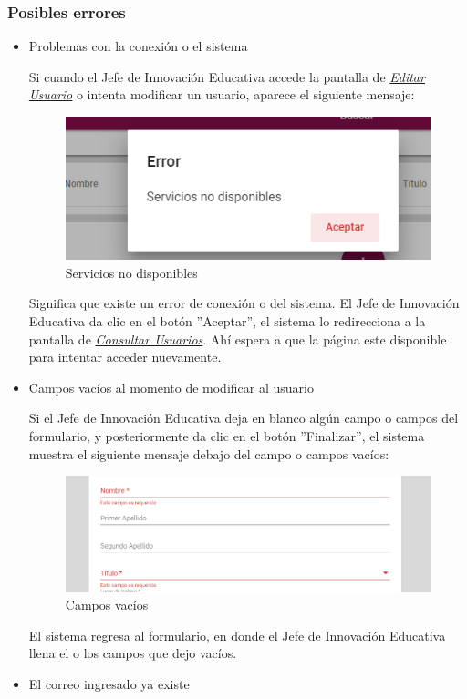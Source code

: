 \subsubsection{Posibles errores}
\begin{itemize}
	\item Problemas con la conexión o el sistema

	Si cuando el Jefe de Innovación Educativa accede la pantalla de \hyperlink{editarUs}{\textit{Editar Usuario}} o intenta modificar un usuario, aparece el siguiente mensaje:
	\clearpage
	\begin{figure}[H]
		\centering
		\includegraphics[width=0.4\linewidth]{images/SP5/MSGSN}
		\caption{Servicios no disponibles}

	\end{figure}


	Significa que existe un error de conexión o del sistema. El Jefe de Innovación Educativa da clic en el botón ''Aceptar'', el sistema lo redirecciona  a la pantalla de \hyperlink{consultarUs}{\textit{Consultar Usuarios}}. Ahí  espera a que la página este disponible para intentar acceder nuevamente.

	\item Campos vacíos al momento de modificar al usuario

	Si el Jefe de Innovación Educativa deja en blanco algún campo o campos del formulario, y posteriormente da clic en el botón ''Finalizar'', el sistema muestra el siguiente mensaje debajo del campo o campos vacíos:

	\begin{figure}[H]
		\centering
		\includegraphics[width=0.4\linewidth]{images/SP5/MSG44}
		\caption{Campos vacíos}
		\label{mensaje44}

	\end{figure}

	El sistema regresa  al formulario, en donde el Jefe de Innovación Educativa llena el o los campos que dejo vacíos.
	\item El correo ingresado ya existe


\end{itemize}
